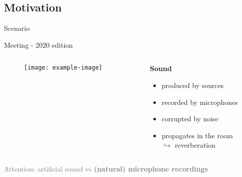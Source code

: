 \subsection{Motivation}

\begin{frame}{Scenario}

    Meeting - 2020 edition

    \vspace{1em}
    \begin{columns}[onlytextwidth]
        \begin{column}{0.69\textwidth}
            \begin{figure}
                \texttt{[image: example-image]}
            \end{figure}
        \end{column}
        \begin{column}{0.29\textwidth}
            \textbf{Sound}
            \begin{itemize}
                \item produced by \alert{sources}
                \item recorded by \alert{microphones}
                \item corrupted by \alert{noise}
                \item  propagates in the \alert{room}
                    \\$\hookrightarrow$ \alert{reverberation}
            \end{itemize}
        \end{column}
    \end{columns}

    \vfill
    \textcolor{gray}{Attention: artificial sound vs \textbf{(natural) microphone recordings}}

\end{frame}

